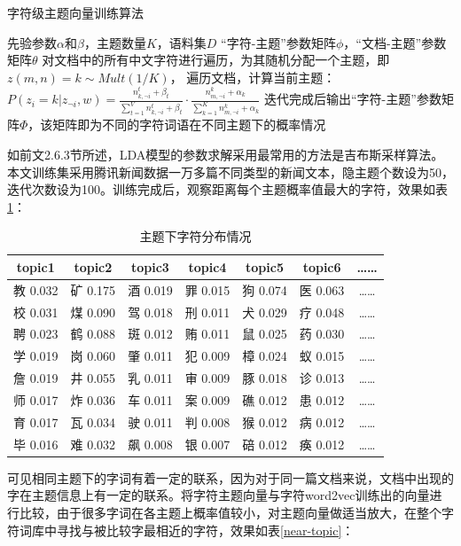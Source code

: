 \documentclass[winfonts,master,oneside,nobackinfo]{njuthesis}
\begin{document}
\begin{algorithm}[h]
\caption{字符级主题向量训练算法}
\begin{algorithmic}[1]
\Require 先验参数$\alpha$和$\beta$，主题数量$K$，语料集$D$
\Ensure “字符-主题”参数矩阵$\phi$，“文档-主题”参数矩阵$\theta$
\State 对文档中的所有中文字符进行遍历，为其随机分配一个主题，即 $z(m,n)=k \sim Mult(1/K )$，
\State 遍历文档，计算当前主题：$P(z_i=k|z_{\neg i}, w) = \frac {n_{k, \neg i}^t + \beta_t} { \sum_{t=1}^{V} n_{k,\neg i}^t + \beta_t} \cdot \frac {n_{m,\neg i}^k + \alpha_k} {\sum_{k=1}^{K} n_{m, \neg i}^k + \alpha_k }$
\State 迭代完成后输出“字符-主题”参数矩阵$\Phi$，该矩阵即为不同的字符词语在不同主题下的概率情况
\end{algorithmic}
\end{algorithm}

如前文2.6.3节所述，LDA模型的参数求解采用最常用的方法是吉布斯采样算法。本文训练集采用腾讯新闻数据一万多篇不同类型的新闻文本，隐主题个数设为50，迭代次数设为100。训练完成后，观察距离每个主题概率值最大的字符，效果如表\ref{topic-char}：

\begin{table}[h]
\centering
\begin{tabular}{ccccccc} %
\hline 
topic1& topic2& topic3& topic4& topic5& topic6&……\\
\hline  
教 0.032& 矿 0.175& 酒 0.019& 罪 0.015&狗 0.074&医 0.063&……\\
校 0.031& 煤 0.090& 驾 0.018& 刑 0.011&犬 0.029&疗 0.048&……\\
聘 0.023& 鹤 0.088& 斑 0.012& 贿 0.011&鼠 0.025&药 0.030&……\\
学 0.019& 岗 0.060& 肇 0.011& 犯 0.009&樟 0.024&蚁 0.015&……\\
詹 0.019& 井 0.055& 乳 0.011& 审 0.009&豚 0.018&诊 0.013&……\\
师 0.017& 炸 0.036& 车 0.011& 案 0.009&礁 0.012&患 0.012&……\\
育 0.017& 瓦 0.034& 驶 0.011& 判 0.008&猴 0.012&病 0.012&……\\
毕 0.016& 难 0.032& 飙 0.008& 银 0.007&碚 0.012&痪 0.012&……\\
\hline 
\end{tabular}
\caption{主题下字符分布情况}
\label{topic-char}
\end{table}

可见相同主题下的字词有着一定的联系，因为对于同一篇文档来说，文档中出现的字在主题信息上有一定的联系。将字符主题向量与字符word2vec训练出的向量进行比较，由于很多字词在各主题上概率值较小，对主题向量做适当放大，在整个字符词库中寻找与被比较字最相近的字符，效果如表\ref{near-topic}：
\end{document}

